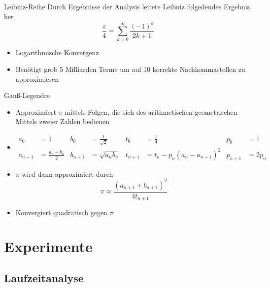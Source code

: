 \documentclass[9pt, t]{beamer}
\begin{document}
\begin{frame}{Leibniz-Reihe}
    Durch Ergebnisse der Analysis leitete Leibniz folgedendes Ergebnis her \cite{Leibniz}
    \[ \frac{\pi}{4} = \sum_{k=0}^{\infty} \frac{(-1)^k}{2k+1} \]
    \begin{itemize}
        \item<3-> Logarithmische Konvergenz \\
        \item<3-> Benötigt grob 5 Milliarden Terme um auf 10 korrekte Nachkommastellen zu approximieren \cite{Leibniz-Approximation}
    \end{itemize}
\end{frame}

\begin{frame}{Gauß-Legendre}                                                                                                        %
    \begin{itemize}
        \item<1-> Approximiert \(\pi\) mittels Folgen, die sich des arithmetischen-geometrischen Mittels zweier Zahlen bedienen
        \item<2->
            \begin{align*}
            a_0     & = 1                   & b_0     & = \frac{1}{\sqrt{2}}                   & t_0     & = \frac{1}{4}                           & p_0     & = 1            \\
            a_{n+1} & = \frac{a_n + b_n}{2} & b_{n+1} & = \sqrt{a_n b_n}                       & t_{n+1} & =t_n - p_n(a_n - a_{n+1})^2             & p_{n+1} & = 2p_n
            \end{align*}    
        \item<3-> \(\pi\) wird dann approximiert durch \[ \pi \approx \frac{(a_{n+1} + b_{n+1})^2}{4t_{n+1}} \]
        \item<4-> Konvergiert quadratisch gegen \(\pi\) \cite{Gauß-Legendre}
    \end{itemize}
\end{frame}

\section{Experimente}

\subsection{Laufzeitanalyse}
\end{document}
